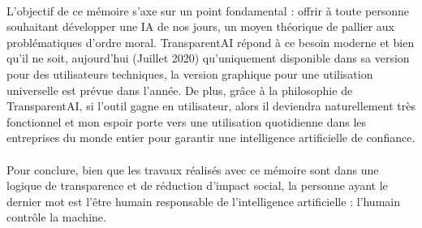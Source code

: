 \documentclass[10pt, french, a4paper]{report}
\begin{document}
\paragraph{}
L’objectif de ce mémoire s’axe sur un point fondamental : offrir à toute personne souhaitant développer une IA de nos jours, un moyen théorique de pallier aux problématiques d’ordre moral. TransparentAI répond à ce besoin moderne et bien qu'il ne soit, aujourd'hui (Juillet 2020) qu'uniquement disponible dans sa version pour des utilisateurs techniques, la version graphique pour une utilisation universelle est prévue dans l'année. De plus, grâce à la philosophie de TransparentAI, si l'outil gagne en utilisateur, alors il deviendra naturellement très fonctionnel et mon espoir porte vers une utilisation quotidienne dans les entreprises du monde entier pour garantir une intelligence artificielle de confiance.

\paragraph{}
Pour conclure, bien que les travaux réalisés avec ce mémoire sont dans une logique de transparence et de réduction d’impact social, la personne ayant le dernier mot est l’être humain responsable de l’intelligence artificielle : l'humain contrôle la machine.

\newpage
% 


\end{document}
